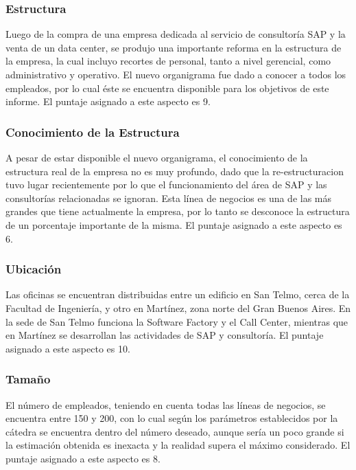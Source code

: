 \documentclass[12pt,a4paper,spanish]{article}
\begin{document}
\subsubsection{Estructura}

Luego de la compra de una empresa dedicada al servicio de consultor\'{i}a SAP y la venta de un data center, se produjo una importante reforma en la estructura de la empresa, la cual incluyo recortes de personal, tanto a nivel gerencial, como administrativo y operativo. El nuevo organigrama fue dado a conocer a todos los empleados, por lo cual \'{e}ste se encuentra disponible para los objetivos de este informe. El puntaje asignado a este aspecto es 9.

\subsubsection{Conocimiento de la Estructura}

A pesar de estar disponible el nuevo organigrama, el conocimiento de la estructura real de la empresa no es muy profundo, dado que la re-estructuracion tuvo lugar recientemente por lo que el funcionamiento del \'{a}rea de SAP y las consultor\'{i}as relacionadas se ignoran. Esta l\'{i}nea de negocios es una de las m\'{a}s grandes que tiene actualmente la empresa, por lo tanto se desconoce la estructura de un porcentaje importante de la misma. El puntaje asignado a este aspecto es 6.

\subsubsection{Ubicaci\'{o}n}

Las oficinas se encuentran distribuidas entre un edificio en San Telmo, cerca de la Facultad de Ingenier\'{i}a, y otro en Mart\'{i}nez, zona norte del Gran Buenos Aires. En la sede de San Telmo funciona la Software Factory y el Call Center, mientras que en Mart\'{i}nez se desarrollan las actividades de SAP y consultor\'{i}a. El puntaje asignado a este aspecto es 10.

\subsubsection{Tama\~{n}o}

El n\'{u}mero de empleados, teniendo en cuenta todas las l\'{i}neas de negocios, se encuentra entre 150 y 200, con lo cual seg\'{u}n los par\'{a}metros establecidos por la c\'{a}tedra se encuentra dentro del n\'{u}mero deseado, aunque ser\'{i}a un poco grande si la estimaci\'{o}n obtenida es inexacta y la realidad supera el m\'{a}ximo considerado. El puntaje asignado a este aspecto es 8. 
\end{document}
